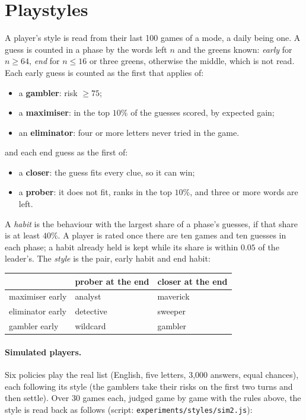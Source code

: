 \documentclass[11pt]{article}
\theoremstyle{definition}
\theoremstyle{remark}
\begin{document}
\section{Playstyles}\label{sec:styles}

A player's style is read from their last 100 games of a mode, a daily being one. A guess
is counted in a phase by the words left $n$ and the greens known: \emph{early} for
$n\ge64$, \emph{end} for $n\le16$ or three greens, otherwise the middle, which is not
read. Each early guess is counted as the first that applies of:

\begin{itemize}
\item a \textbf{gambler}: risk $\ge75$;
\item a \textbf{maximiser}: in the top $10\%$ of the guesses scored, by expected gain;
\item an \textbf{eliminator}: four or more letters never tried in the game.
\end{itemize}

and each end guess as the first of:

\begin{itemize}
\item a \textbf{closer}: the guess fits every clue, so it can win;
\item a \textbf{prober}: it does not fit, ranks in the top $10\%$, and three or more
words are left.
\end{itemize}

A \emph{habit} is the behaviour with the largest share of a phase's guesses, if that
share is at least $40\%$. A player is rated once there are ten games and ten guesses in
each phase; a habit already held is kept while its share is within $0.05$ of the
leader's. The \emph{style} is the pair, early habit and end habit:

\begin{center}
\begin{tabular}{lll}
\toprule
 & prober at the end & closer at the end\\
\midrule
maximiser early & analyst & maverick\\
eliminator early & detective & sweeper\\
gambler early & wildcard & gambler\\
\bottomrule
\end{tabular}
\end{center}

\paragraph{Simulated players.} Six policies play the real list (English, five letters,
3,000 answers, equal chances), each following its style (the gamblers take their risks
on the first two turns and then settle). Over 30 games each, judged game by game
with the rules above, the style is read back as follows (script:
\texttt{experiments/styles/sim2.js}):
\end{document}
